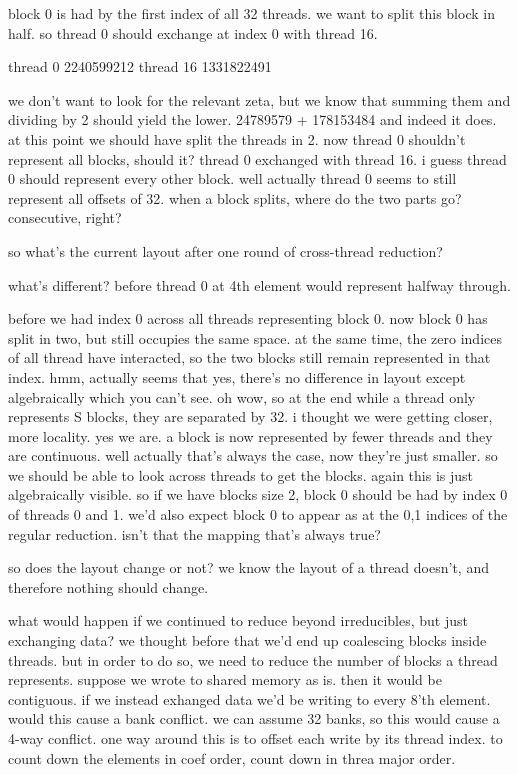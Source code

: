 block 0 is had by the first index of all 32 threads. 
we want to split this block in half. 
so thread 0 should exchange at index 0 with thread 16. 

thread 0
2240599212
thread 16
1331822491

we don't want to look for the relevant zeta, but we know that summing them and dividing by 2 should yield the lower.
24789579 + 178153484
and indeed it does.
at this point we should have split the threads in 2. 
now thread 0 shouldn't represent all blocks, should it?
thread 0 exchanged with thread 16.
i guess thread 0 should represent every other block.
well actually thread 0 seems to still represent all offsets of 32.
when a block splits, where do the two parts go? consecutive, right?

so what's the current layout after one round of cross-thread reduction?

what's different?
before thread 0 at 4th element would represent halfway through. 

before we had index 0 across all threads representing block 0.
now block 0 has split in two, but still occupies the same space. 
at the same time, the zero indices of all thread have interacted, so the two blocks still remain represented in that index. 
hmm, actually seems that yes, there's no difference in layout except algebraically which you can't see. 
oh wow, so at the end while a thread only represents S blocks, they are separated by 32. i thought we were getting closer, more locality. yes we are. a block is now represented by fewer threads and they are continuous. well actually that's always the case, now they're just smaller.
so we should be able to look across threads to get the blocks. again this is just algebraically visible.
so if we have blocks size 2, block 0 should be had by index 0 of threads 0 and 1. we'd also expect block 0 to appear as at the 0,1 indices of the regular reduction. isn't that the mapping that's always true? 

so does the layout change or not?
we know the layout of a thread doesn't, and therefore nothing should change.

what would happen if we continued to reduce beyond irreducibles, but just exchanging data?
we thought before that we'd end up coalescing blocks inside threads. 
but in order to do so, we need to reduce the number of blocks a thread represents. 
suppose we wrote to shared memory as is. then it would be contiguous. if we instead exhanged data we'd be writing to every 8'th element. would this cause a bank conflict. we can assume 32 banks, so this would cause a 4-way conflict. one way around this is to offset each write by its thread index.
to count down the elements in coef order, count down in threa major order. 

